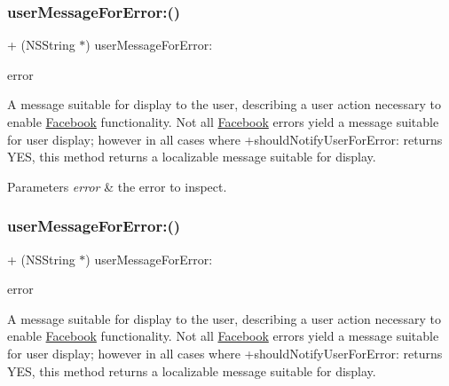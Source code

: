 \subsubsection{\texorpdfstring{user\+Message\+For\+Error\+:()}{userMessageForError:()}\hspace{0.1cm}{\footnotesize\ttfamily [3/5]}}
{\footnotesize\ttfamily + (N\+S\+String $\ast$) user\+Message\+For\+Error\+: \begin{DoxyParamCaption}\item[{(N\+S\+Error $\ast$)}]{error }\end{DoxyParamCaption}}

A message suitable for display to the user, describing a user action necessary to enable \hyperlink{interfaceFacebook}{Facebook} functionality. Not all \hyperlink{interfaceFacebook}{Facebook} errors yield a message suitable for user display; however in all cases where +should\+Notify\+User\+For\+Error\+: returns Y\+ES, this method returns a localizable message suitable for display.


\begin{DoxyParams}{Parameters}
{\em error} & the error to inspect. \\
\hline
\end{DoxyParams}
\mbox{\label{interfaceFBErrorUtility_a059cc6fc35dd8fd3a13ee584ca7bb391}} 
\subsubsection{\texorpdfstring{user\+Message\+For\+Error\+:()}{userMessageForError:()}\hspace{0.1cm}{\footnotesize\ttfamily [4/5]}}
{\footnotesize\ttfamily + (N\+S\+String $\ast$) user\+Message\+For\+Error\+: \begin{DoxyParamCaption}\item[{(N\+S\+Error $\ast$)}]{error }\end{DoxyParamCaption}}

A message suitable for display to the user, describing a user action necessary to enable \hyperlink{interfaceFacebook}{Facebook} functionality. Not all \hyperlink{interfaceFacebook}{Facebook} errors yield a message suitable for user display; however in all cases where +should\+Notify\+User\+For\+Error\+: returns Y\+ES, this method returns a localizable message suitable for display.


